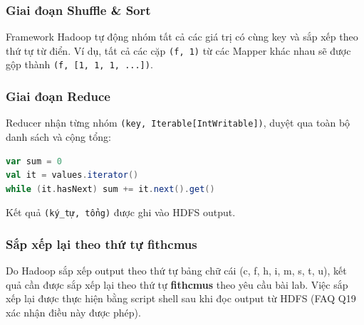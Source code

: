 \subsubsection{Giai đoạn Shuffle \& Sort}

Framework Hadoop tự động nhóm tất cả các giá trị có cùng key và sắp xếp theo thứ tự từ điển. Ví dụ, tất cả các cặp \texttt{(f, 1)} từ các Mapper khác nhau sẽ được gộp thành \texttt{(f, [1, 1, 1, ...])}.

\subsubsection{Giai đoạn Reduce}

Reducer nhận từng nhóm \texttt{(key, Iterable[IntWritable])}, duyệt qua toàn bộ danh sách và cộng tổng:
\begin{lstlisting}[language=scala, numbers=none]
var sum = 0
val it = values.iterator()
while (it.hasNext) sum += it.next().get()
\end{lstlisting}
Kết quả \texttt{(ký\_tự, tổng)} được ghi vào HDFS output.

\subsubsection{Sắp xếp lại theo thứ tự fithcmus}

Do Hadoop sắp xếp output theo thứ tự bảng chữ cái (c, f, h, i, m, s, t, u), kết quả cần được sắp xếp lại theo thứ tự \textbf{fithcmus} theo yêu cầu bài lab. Việc sắp xếp lại được thực hiện bằng script shell sau khi đọc output từ HDFS (FAQ Q19 xác nhận điều này được phép).
